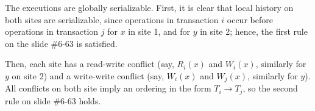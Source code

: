 The executions are globally serializable.
First, it is clear that local history on both sites are serializable, since operations in transaction $i$ occur before operations in transaction $j$ for $x$ in site 1, and for $y$ in site 2;
hence, the first rule on the slide \#6-63 is satisfied.

Then, each site has a read-write conflict (say, $R_i(x)$ and $W_i(x)$, similarly for $y$ on site 2) and a write-write conflict (say, $W_i(x)$ and $W_j(x)$, similarly for $y$).
All conflicts on both site imply an ordering in the form $T_i \rightarrow T_j$, so the second rule on slide \#6-63 holds.
